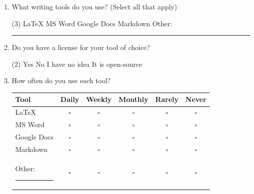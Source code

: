 \documentclass[a4paper,12pt]{article}
\begin{document}
\begin{enumerate}[resume]

\item What writing tools do you use? (Select all that apply)
\begin{tasks}(3)
\task LaTeX \task MS Word \task Google Docs
\task Markdown \task Other: \rule{2.5cm}{0.4pt}
\end{tasks}

\item Do you have a license for your tool of choice?
\begin{tasks}(2)
\task Yes \task No \task I have no idea \task It is open-source
\end{tasks}
\item How often do you use each tool?

\vspace{0.3cm}

{\small
\begin{tabular}{@{}lccccc@{}}
\toprule
\textbf{Tool} & \textbf{Daily} & \textbf{Weekly} & \textbf{Monthly} & \textbf{Rarely} & \textbf{Never} \\
\midrule
LaTeX        & $\square$ & $\square$ & $\square$ & $\square$ & $\square$ \\
MS Word      & $\square$ & $\square$ & $\square$ & $\square$ & $\square$ \\
Google Docs  & $\square$ & $\square$ & $\square$ & $\square$ & $\square$ \\
Markdown     & $\square$ & $\square$ & $\square$ & $\square$ & $\square$ \\
Other: \rule{2.5cm}{0.4pt}     & $\square$ & $\square$ & $\square$ & $\square$ & $\square$ \\
\bottomrule
\end{tabular}
}

\end{enumerate}
\vspace{1pt}

\end{document}
